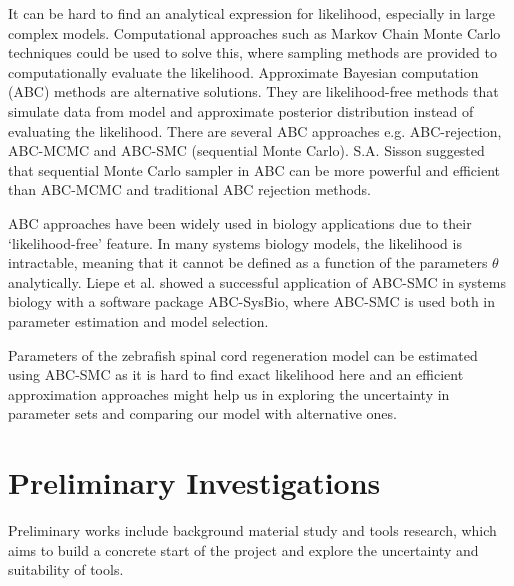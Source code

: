 \documentclass{article}
\begin{document}
It can be hard to find an analytical expression for likelihood, especially in large 
complex models. Computational approaches such as Markov Chain Monte Carlo\cite{ref:Gilks} techniques
could be used 
to solve this, where sampling methods are provided to computationally evaluate the likelihood.
Approximate Bayesian computation (ABC) methods are alternative solutions. They are likelihood-free 
methods that simulate data from model and approximate posterior distribution 
instead of evaluating the likelihood. There are several ABC approaches e.g. ABC-rejection, ABC-MCMC
and ABC-SMC (sequential Monte Carlo)\cite{ref:Toni}. S.A. Sisson\cite{ref:Sisson} suggested that sequential Monte Carlo sampler in ABC can 
be more powerful and efficient than ABC-MCMC and traditional ABC rejection methods. 

ABC approaches have been widely used in biology applications due to their 
‘likelihood-free’ feature. In many systems biology models, the likelihood is 
intractable, meaning that it cannot be defined as a function of the 
parameters $\theta$ analytically. Liepe et al.\cite{ref:Liepe} showed a 
successful application of 
ABC-SMC in systems biology 
with a software package ABC-SysBio, where ABC-SMC is used both in parameter estimation and model 
selection.

Parameters of the zebrafish spinal cord regeneration model can be estimated 
using ABC-SMC as it is hard to find exact likelihood here and an efficient 
approximation approaches might help us in exploring the uncertainty in parameter 
sets and comparing our model with alternative ones.





\section{Preliminary Investigations}

Preliminary works include background material study and tools research, which aims to build a concrete start of the project and explore the uncertainty and suitability of tools.
\end{document}
